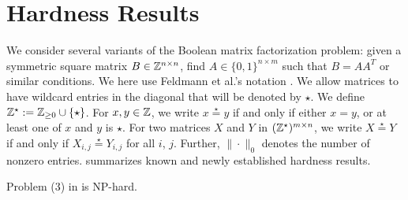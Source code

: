 \section{Hardness Results}

We consider several variants of the Boolean matrix factorization problem:
 given a symmetric square matrix $B \in \mathbb{Z}^{n \times n}$, find $A \in \{0,1\}^{n \times m}$ such that $B=AA^T$ or similar conditions.
We here use Feldmann et al.'s notation \cite{feldmann_fixed-parameter_2020}.
%
We allow matrices to have wildcard entries in the diagonal that will be denoted by $\star$.
We define $\mathbb{Z}^\star := \mathbb{Z}_{\geq 0} \cup \{\star\}$.
For $x, y \in \mathbb{Z}$, we write $x \stackrel{\star}{=} y$ if and only if either $x=y$, or at least one of $x$ and $y$ is $\star$.
For two matrices $X$ and $Y$ in $(\mathbb{Z}^\star)^{m\times n}$, we write $X \stackrel{\star}{=} Y$
 if and only if $X_{i,j} \stackrel{\star}{=} Y_{i,j}$ for all $i$, $j$.
Further, $\|\cdot\|_0$ denotes the number of nonzero entries.
%
 summarizes known and newly established hardness results.



\begin{thm}\label{thm:hardness-bounded}
  Problem (3) in  is NP-hard.
\end{thm}

